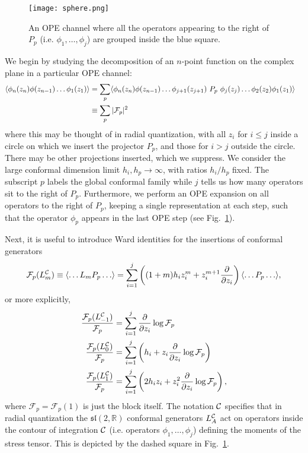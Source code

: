 \documentclass[12pt]{article}
\newcommand{\sltwo}{$\lie{sl}(2,\RR)$ }
\newcommand{\RR}{\mathbb{R}}
\newcommand{\lie}[1]{\mathfrak{#1}}
\begin{document}
\begin{figure}
  \centering
  \texttt{[image: sphere.png]}\\
  \caption{
  An OPE channel where all the operators appearing to the right of $P_p$ (i.e. $\phi_1,\ldots, \phi_j$) are grouped inside the blue square.
  }\label{blocksphere}
\end{figure}
We begin by studying the decomposition of an $n$-point function on the complex plane  in a particular OPE channel:
\begin{align}
\langle \phi_n(z_n)\phi(z_{n-1}) \ldots \phi_1(z_1)\rangle
&=\sum_{p}
\langle \phi_n(z_n)\phi(z_{n-1}) \ldots \phi_{j+1}(z_{j+1}) ~P_p ~ \phi_j(z_{j})\ldots \phi_2(z_{2})\phi_1(z_1)\rangle
\cr &\equiv \sum_p |\mathcal{F}_p|^2
\end{align}
where this may be thought of in radial quantization, with all $z_i$ for $i\leq j$ inside a circle on which we insert the projector $P_p$, and those for $i>j$ outside the circle. There may be other projections inserted, which we suppress. We consider the large conformal dimension limit $h_i ,h_p\rightarrow \infty$, with ratios $h_i/h_p$ fixed. The subscript $p$ labels the global conformal family while  $j$ tells us how many operators sit to the right of $P_p$.
Furthermore, we perform an OPE expansion on all operators to the right of $P_p$, keeping a single representation at each step,  such that the operator $\phi_p$ appears in the last OPE step
(see Fig.~\ref{blocksphere}).

Next, it is useful to introduce Ward identities \cite{BPZ} for the insertions of conformal generators
\begin{equation}
 \mathcal{F}_p(L_m^{\cal{C}})\equiv\langle \ldots  L_{m}P_p \ldots\rangle
=\sum_{i=1}^{j}\left(
(1+m)h_{i}z^{m}_{i}
+z_{i}^{m+1}\frac{\partial}{\partial z_{i}}
\right)\langle \ldots P_p \ldots\rangle,
\end{equation}
or more explicitly,
\begin{align}
	\label{eq:semiWard}
 \frac{\mathcal{F}_p(L_{-1}^{\cal{C}})}{\mathcal{F}_p} &= \sum_{i=1}^{j}\frac{\partial}{\partial z_i}\log \mathcal{F}_p \notag \\
\frac{\mathcal{F}_p(L_0^{\cal{C}})}{\mathcal{F}_p} &= \sum_{i=1}^{j}\left(h_{i}+z_{i}\frac{\partial}{\partial z_i}\log \mathcal{F}_p\right) \notag \\
\frac{\mathcal{F}_p(L_1^{\cal{C}})}{\mathcal{F}_p} &= \sum_{i=1}^{j}\left(2h_{i}z_{i}+z_{i}^2\frac{\partial}{\partial z_{i}}
\log\mathcal{F}_p\right),
\end{align}
%
where $\mathcal{F}_p = \mathcal{F}_p(1)$ is just the block itself.
The notation ${\cal C}$ specifies that in radial quantization the \sltwo conformal generators $L_A^{\cal C}$ act on operators inside the contour of integration ${\cal{C}}$ (i.e. operators $\phi_1,\ldots, \phi_j$) defining the moments of the stress tensor. This is depicted by the dashed square in Fig.~\ref{blocksphere}.
\end{document}
